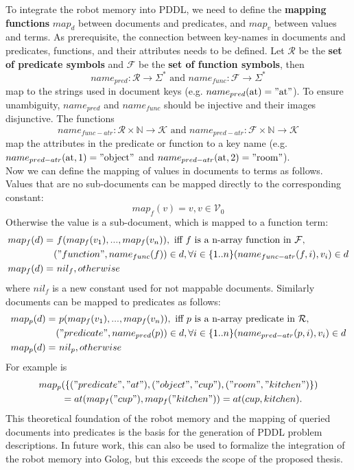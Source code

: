 \documentclass[a4paper,11pt]{article}
\begin{document}
To integrate the robot memory into PDDL, we need to define the
\textbf{mapping functions} $map_d$ between documents and predicates, and
$map_v$ between values and terms. As prerequisite, the connection
between key-names in documents and predicates, functions, and their
attributes needs to be defined. Let $\mathcal{R}$ be the \textbf{set
  of predicate symbols} and $\mathcal{F}$ be the \textbf{set of function
  symbols}, then
%
$$name_{pred}: \mathcal{R} \rightarrow \Sigma^*
\text{ and } name_{func}: \mathcal{F} \rightarrow \Sigma^*$$
%
map to the strings used in document keys
(e.g. $name_{pred}(\text{at})="\text{at}"$). To ensure unambiguity,
$name_{pred}$ and $name_{func}$ should
be injective and their images disjunctive. The functions
%
$$ name_{func-atr}: \mathcal{R} \times \mathbb{N} \rightarrow
\mathcal{K} \text{ and } name_{pred-atr}: \mathcal{F} \times \mathbb{N}
\rightarrow \mathcal{K}$$
%
map the attributes in the predicate or function to a key
name (e.g. $name_{pred-atr}(\text{at},1)="\text{object}"$ and
$name_{pred-atr}(\text{at},2)="\text{room}"$).
\\
Now we can define the mapping of values in documents to terms as
follows. Values that are no sub-documents can be mapped directly to
the corresponding constant:
$$map_f(v)=v, v \in \mathcal{V}_0$$
Otherwise the value is a sub-document, which is mapped to a function term:
\begin{align*}
  map_f(d)= &\text{ }f(map_f(v_1), ..., map_f(v_n)), \text{ iff } f \text{ is a n-array function in } \mathcal{F},\\
  &("function", name_{func}(f))\in d,
  \forall i \in \{1..n\} (name_{func-atr}(f,i), v_i)\in d\\
  map_f(d)= &\text{ } nil_f, otherwise\text{~~~~~~~~~~~~~~~}
\end{align*}
where $nil_f$ is a new constant used for not mappable documents.
Similarly documents can be mapped to predicates as follows:
\begin{align*}
  map_p(d)=&\text{ }p(map_f(v_1), ..., map_f(v_n)), \text{ iff } p \text{ is a n-array predicate in } \mathcal{R},\\
  &("predicate", name_{pred}(p))\in d,
  \forall i \in \{1..n\} (name_{pred-atr}(p,i), v_i)\in d\\
  map_p(d)=& \text{ }nil_p, otherwise\text{~~~~~~~~~~~~~~~}
\end{align*}
For example is
\begin{align*}
map_p&(\{("predicate", "at"),("object", "cup"),("room",
"kitchen")\})\\
&= at(map_f("cup"), map_f("kitchen")) = at(cup, kitchen) \text{.}
\end{align*}
This theoretical foundation of the robot memory and the mapping of
queried documents into predicates is the basis for the generation of
PDDL problem descriptions. In future work, this can also be used to
formalize the integration of the robot memory into Golog, but this
exceeds the scope of the proposed thesis.
\end{document}
